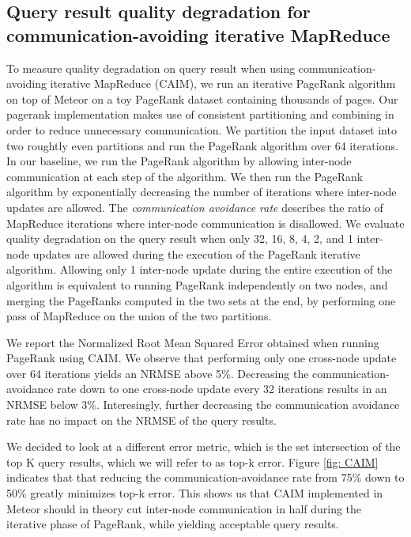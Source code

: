 \subsection{Query result quality degradation for communication-avoiding iterative MapReduce}

To measure quality degradation on query result when using communication-avoiding iterative MapReduce (CAIM), we run an iterative PageRank algorithm on top of Meteor on a toy PageRank dataset containing thousands of pages. Our pagerank implementation makes use of consistent partitioning and combining in order to reduce unnecessary communication. We partition the input dataset into two roughtly even partitions and run the PageRank algorithm over 64 iterations. In our baseline, we run the PageRank algorithm by allowing inter-node communication at each step of the algorithm. We then run the PageRank algorithm by exponentially decreasing the number of iterations where inter-node updates are allowed. The \emph{communication avoidance rate} describes the ratio of MapReduce iterations where inter-node communication is disallowed. We evaluate quality degradation on the query result when only 32, 16, 8, 4, 2, and 1 inter-node updates are allowed during the execution of the PageRank iterative algorithm. Allowing only 1 inter-node update during the entire execution of the algorithm is equivalent to running PageRank independently on two nodes, and merging the PageRanks computed in the two sets at the end, by performing one pass of MapReduce on the union of the two partitions. 

We report the Normalized Root Mean Squared Error obtained when running PageRank using CAIM. We observe that performing only one cross-node update over 64 iterations yields an NRMSE above 5\%. Decreasing the communication-avoidance rate down to one cross-node update every 32 iterations results in an NRMSE below 3\%. Interesingly, further decreasing the communication avoidance rate has no impact on the NRMSE of the query results. 

We decided to look at a different error metric, which is the set intersection of the top K query results, which we will refer to as top-k error. Figure \ref{fig: CAIM} indicates that that reducing the communication-avoidance rate from 75\% down to 50\% greatly minimizes top-k error. This shows us that CAIM implemented in Meteor should in theory cut inter-node communication in half during the iterative phase of PageRank, while yielding acceptable query results. 

